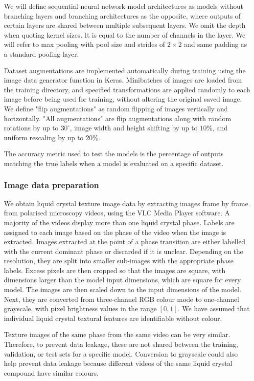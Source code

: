 \documentclass[12pt]{article}
\begin{document}
We will define sequential neural network model architectures as models without branching layers and branching architectures as the opposite, where outputs of certain layers are shared between multiple subsequent layers. We omit the depth when quoting kernel sizes. It is equal to the number of channels in the layer. We will refer to max pooling with pool size and strides of $2 \times 2$ and same padding as a standard pooling layer.

Dataset augmentations are implemented automatically during training using the image data generator function in Keras. Minibatches of images are loaded from the training directory, and specified transformations are applied randomly to each image before being used for training, without altering the original saved image. We define "flip augmentations" as random flipping of images vertically and horizontally. "All augmentations" are flip augmentations along with random rotations by up to $30^\circ$, image width and height shifting by up to $10\%$, and uniform rescaling by up to $20\%$.

The accuracy metric used to test the models is the percentage of outputs matching the true labels when a model is evaluated on a specific dataset.
\subsubsection{Image data preparation}
\label{ImgPrep}
We obtain liquid crystal texture image data by extracting images frame by frame from polarised microscopy videos, using the VLC Media Player software. A majority of the videos display more than one liquid crystal phase. Labels are assigned to each image based on the phase of the video when the image is extracted. Images extracted at the point of a phase transition are either labelled with the current dominant phase or discarded if it is unclear. Depending on the resolution, they are split into smaller sub-images with the appropriate phase labels. Excess pixels are then cropped so that the images are square, with dimensions larger than the model input dimensions, which are square for every model. The images are then scaled down to the input dimensions of the model. Next, they are converted from three-channel RGB colour mode to one-channel grayscale, with pixel brightness values in the range $[0,1]$. We have assumed that individual liquid crystal textural features are identifiable without colour.

Texture images of the same phase from the same video can be very similar. Therefore, to prevent data leakage, these are not shared between the training, validation, or test sets for a specific model. Conversion to grayscale could also help prevent data leakage because different videos of the same liquid crystal compound have similar colours.
\end{document}
